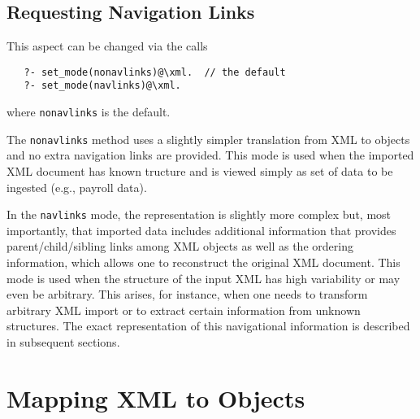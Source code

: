 \subsection{Requesting Navigation Links}

This aspect can be changed via the calls
\begin{verbatim}
   ?- set_mode(nonavlinks)@\xml.  // the default
   ?- set_mode(navlinks)@\xml.
\end{verbatim}
where \texttt{nonavlinks} is the default.

The \texttt{nonavlinks} method uses a slightly simpler translation from XML
to \FLSYSTEM objects and no extra navigation links are provided.
This mode is used when the imported XML document has known tructure
and is viewed simply as
set of data to be ingested (e.g., payroll data).

In the \texttt{navlinks} mode, the representation is slightly more complex
but, most importantly, that imported data includes additional information 
that provides parent/child/sibling links among XML objects as well as the
ordering information, which allows one to reconstruct the original XML
document.  This mode is used when the structure
of the input XML has high variability or may even be arbitrary. This
arises, for instance, when one needs to transform arbitrary XML import or
to extract certain information from unknown structures.
The exact representation of this navigational information is described in 
subsequent sections.




\section{Mapping XML to \FLSYSTEM Objects}\label{xml-to-flora}

